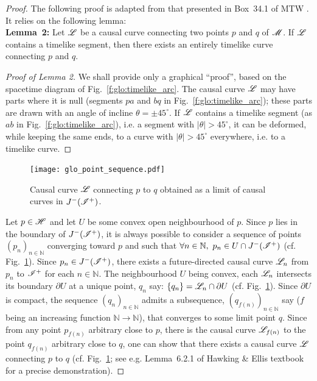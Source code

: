 \begin{proof}
The following proof is adapted from that presented in Box~34.1 of MTW \cite{MisneTW73}.
It relies on the following lemma:\\[1ex]
\textbf{Lemma~2:} Let $\mathscr{L}$ be a causal curve connecting two points $p$ and $q$
of $\mathscr{M}$. If $\mathscr{L}$ contains a timelike segment, then there exists an
entirely timelike curve connecting $p$ and $q$.
\begin{proof}[Proof of Lemma 2]
We shall provide only a graphical ``proof'', based on the spacetime diagram
of Fig.~\ref{f:glo:timelike_arc}. The causal curve $\mathscr{L}$ may have parts where it is null (segments $pa$ and $bq$ in Fig.~\ref{f:glo:timelike_arc}); these parts are drawn with
an angle of incline $\theta = \pm 45^\circ$.
If $\mathscr{L}$ contains a timelike segment (as $ab$ in Fig.~\ref{f:glo:timelike_arc}), i.e. a segment with $|\theta|>45^\circ$,
it can be deformed, while keeping the same ends, to a curve with $|\theta|>45^\circ$
everywhere, i.e. to a timelike curve.
\end{proof}


\begin{figure}
\centerline{\texttt{[image: glo\_point\_sequence.pdf]}}
\caption[]{\label{f:glo:point_sequence} \footnotesize
Causal curve $\mathscr{L}$ connecting $p$ to $q$ obtained as a limit of causal curves
in $J^-(\mathscr{I}^+)$.}
\end{figure}


Let $p\in\mathscr{H}$ and let $U$ be some convex open neighbourhood of $p$.
Since $p$ lies in the boundary of $J^-(\mathscr{I}^+)$, it is always possible to
consider
a sequence of points $(p_n)_{n\in\mathbb{N}}$ converging toward $p$
and such that $\forall n\in\mathbb{N},\ p_n \in U \cap J^-(\mathscr{I}^+)$
(cf. Fig.~\ref{f:glo:point_sequence}).
Since $p_n\in J^-(\mathscr{I}^+)$,
there exists a future-directed causal curve $\mathscr{L}_{n}$ from $p_n$ to $\mathscr{I}^+$
for each $n\in\mathbb{N}$.
The neighbourhood $U$ being convex, each $\mathscr{L}_n$ intersects its boundary $\partial U$
at a unique point, $q_n$ say: $\{q_n\}=\mathscr{L}_n \cap \partial U$
(cf. Fig.~\ref{f:glo:point_sequence}).
Since $\partial U$
is compact, the sequence $(q_n)_{n\in\mathbb{N}}$ admits a subsequence,
$(q_{f(n)})_{n\in\mathbb{N}}$ say ($f$ being an increasing
function $\mathbb{N}\rightarrow\mathbb{N}$),
that converges to some limit point $q$.
Since from any point $p_{f(n)}$ arbitrary close to $p$, there is
the causal curve $\mathscr{L}_{f(n)}$ to the point $q_{f(n)}$ arbitrary close to $q$,
one can show that
there exists a causal curve $\mathscr{L}$ connecting $p$ to $q$
(cf. Fig.~\ref{f:glo:point_sequence}; see e.g.
Lemma~6.2.1 of Hawking \& Ellis textbook \cite{HawkiE73}
for a precise demonstration).


\end{proof}
